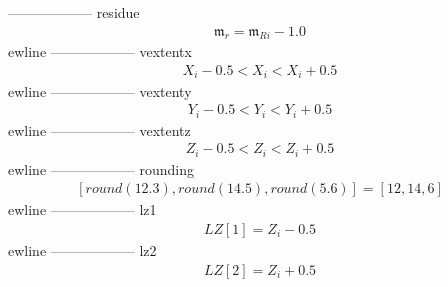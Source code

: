 ------------------
\newline
residue\newline
\begin{equation*}
 \begin{split}
 \mathfrak{m}_r = \mathfrak{m}_{Ri}-1.0\end{split}
 \end{equation*}
ewline
------------------
\newline
vextentx\newline
\begin{equation*}
 \begin{split}
 X_i-0.5 < X_i < X_i+0.5\end{split}
 \end{equation*}
ewline
------------------
\newline
vextenty\newline
\begin{equation*}
 \begin{split}
 Y_i-0.5 < Y_i < Y_i+0.5\end{split}
 \end{equation*}
ewline
------------------
\newline
vextentz\newline
\begin{equation*}
 \begin{split}
 Z_i-0.5 < Z_i < Z_i+0.5\end{split}
 \end{equation*}
ewline
------------------
\newline
rounding\newline
\begin{equation*}
 \begin{split}
 [round(12.3), round(14.5), round(5.6)] = [12,14,6]\end{split}
 \end{equation*}
ewline
------------------
\newline
lz1\newline
\begin{equation*}
 \begin{split}
 LZ[1] = Z_i-0.5\end{split}
 \end{equation*}
ewline
------------------
\newline
lz2\newline
\begin{equation*}
 \begin{split}
 LZ[2] = Z_i+0.5\end{split}
 \end{equation*}
